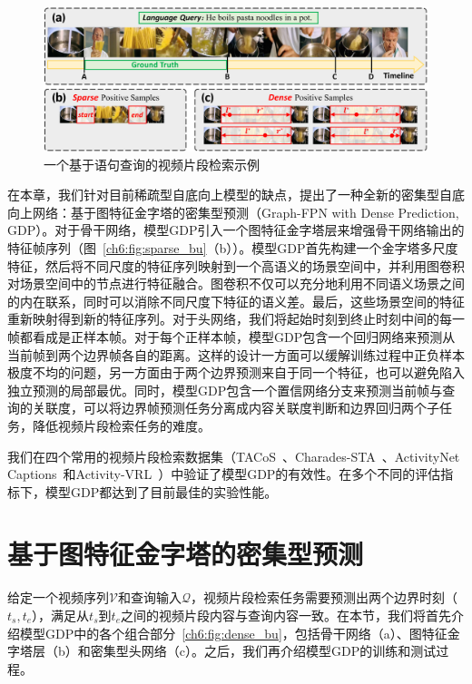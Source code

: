 \begin{figure}[t]
    \centering
    \includegraphics[width=0.98\linewidth]{chapter6/res/headnetwork_motivation.pdf}
    \caption{一个基于语句查询的视频片段检索示例}
    \label{ch6:fig:headnetwork_motivation}
\end{figure}


在本章，我们针对目前稀疏型自底向上模型的缺点，提出了一种全新的密集型自底向上网络：基于图特征金字塔的密集型预测（Graph-FPN with Dense Prediction, GDP）。对于骨干网络，模型GDP引入一个图特征金字塔层来增强骨干网络输出的特征帧序列（图~\ref{ch6:fig:sparse_bu}（b））。模型GDP首先构建一个金字塔多尺度特征，然后将不同尺度的特征序列映射到一个高语义的场景空间中，并利用图卷积对场景空间中的节点进行特征融合。图卷积不仅可以充分地利用不同语义场景之间的内在联系，同时可以消除不同尺度下特征的语义差。最后，这些场景空间的特征重新映射得到新的特征序列。对于头网络，我们将起始时刻到终止时刻中间的每一帧都看成是正样本帧。对于每个正样本帧，模型GDP包含一个回归网络来预测从当前帧到两个边界帧各自的距离。这样的设计一方面可以缓解训练过程中正负样本极度不均的问题，另一方面由于两个边界预测来自于同一个特征，也可以避免陷入独立预测的局部最优。同时，模型GDP包含一个置信网络分支来预测当前帧与查询的关联度，可以将边界帧预测任务分离成内容关联度判断和边界回归两个子任务，降低视频片段检索任务的难度。

我们在四个常用的视频片段检索数据集（TACoS~\cite{regneri2013grounding}、Charades-STA~\cite{gao2017tall}、ActivityNet Captions~\cite{krishna2017dense}和Activity-VRL~\cite{feng2018video}）中验证了模型GDP的有效性。在多个不同的评估指标下，模型GDP都达到了目前最佳的实验性能。

\section{基于图特征金字塔的密集型预测}

给定一个视频序列$\mathcal{V}$和查询输入$\mathcal{Q}$，视频片段检索任务需要预测出两个边界时刻（$t_s, t_e$），满足从$t_s$到$t_e$之间的视频片段内容与查询内容一致。在本节，我们将首先介绍模型GDP中的各个组合部分~\ref{ch6:fig:dense_bu}，包括骨干网络（a）、图特征金字塔层（b）和密集型头网络（c）。之后，我们再介绍模型GDP的训练和测试过程。

